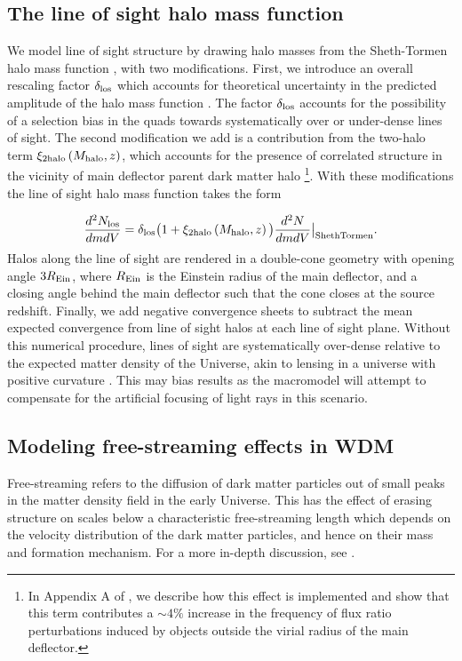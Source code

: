 \subsection{The line of sight halo mass function}
\label{ssec:losmfunc}
We model line of sight structure by drawing halo masses from the Sheth-Tormen halo mass function \citep{ST99}, with two modifications. First, we introduce an overall rescaling factor $\delta_{\rm{los}}$ which accounts for theoretical uncertainty in the predicted amplitude of the halo mass function \citep[see e.g.][]{Despali++16}. The factor $\delta_{\rm{los}}$ accounts for the possibility of a selection bias in the quads towards systematically over or under-dense lines of sight. The second modification we add is a contribution from the two-halo term $\xi_{\rm{2halo}} \left(M_{\rm{halo}}, z\right)$, which accounts for the presence of correlated structure in the vicinity of main deflector parent dark matter halo \footnote{In Appendix A of \citet{Gilman++19}, we describe how this effect is implemented and show that this term contributes a $\sim 4\%$ increase in the frequency of flux ratio perturbations induced by objects outside the virial radius of the main deflector.}. With these modifications the line of sight halo mass function takes the form

\begin{equation}
\label{eqn:losmfunc}
\frac{d^2N_{\rm{los}}}{dm  dV} = {\delta_{\rm{los}}} \big(1+ \xi_{\rm{2halo}}\left(M_{\rm{halo}}, z\right)\big) \frac{d^2N}{dm  dV} \big \vert_{\rm{ShethTormen}}.
\end{equation}
Halos along the line of sight are rendered in a double-cone geometry with opening angle $3 R_{\rm{Ein}}$, where $R_{\rm{Ein}}$ is the Einstein radius of the main deflector, and a closing angle behind the main deflector such that the cone closes at the source redshift. Finally, we add negative convergence sheets to subtract the mean expected convergence from line of sight halos at each line of sight plane. Without this numerical procedure, lines of sight are systematically over-dense relative to the expected matter density of the Universe, akin to lensing in a universe with positive curvature \citep{Birrer++17b}. This may bias results as the macromodel will attempt to compensate for the artificial focusing of light rays in this scenario.  

\subsection{Modeling free-streaming effects  in WDM}
\label{ssec:modelingwdm}
Free-streaming refers to the diffusion of dark matter particles out of small peaks in the matter density field in the early Universe. This has the effect of erasing structure on scales below a characteristic free-streaming length which depends on the velocity distribution of the dark matter particles, and hence on their mass and formation mechanism. For a more in-depth discussion, see \citet{Schneider++13}.  

